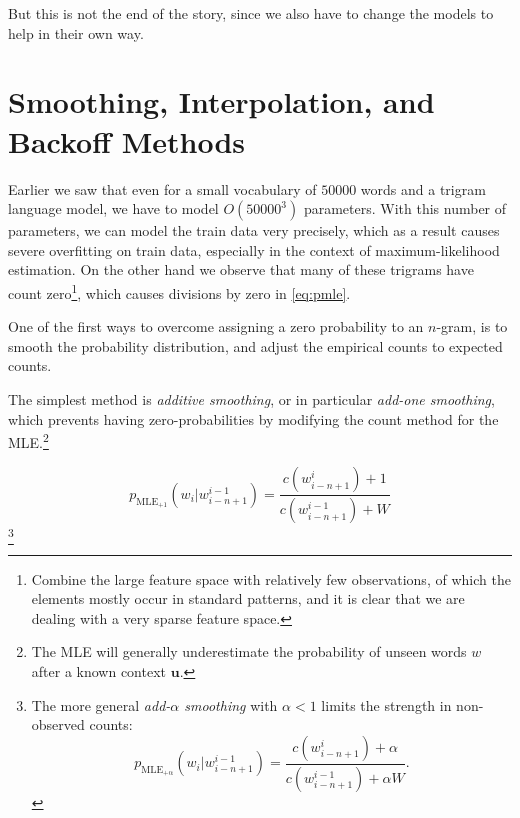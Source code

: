 But this is not the end of the story, since we also have to change the models to help in their own way.


\section{Smoothing, Interpolation, and Backoff Methods}
Earlier we saw that even for a small vocabulary of $50000$ words and a trigram language model, we have to model $O(50000^3)$ parameters. With this number of parameters, we can model the train data very precisely, which as a result causes severe overfitting on train data, especially in the context of maximum-likelihood estimation. On the other hand we observe that many of these trigrams have count zero\footnote{Combine the large feature space with relatively few observations, of which the elements mostly occur in standard patterns, and it is clear that we are dealing with a very sparse feature space.}, which causes divisions by zero in \cref{eq:pmle}.

One of the first ways to overcome assigning a zero probability to an $n$-gram, is to smooth the probability distribution, and adjust the empirical counts to expected counts.

The simplest method is \emph{additive smoothing}, or in particular \emph{add-one smoothing}, which prevents having zero-probabilities by modifying the count method for the MLE.\footnote{The MLE will generally underestimate the probability of unseen words $w$ after a known context $\mathbf{u}$.}



\begin{equation} p_{\operatorname{MLE_{+1}}}\left(w_i|w_{i-n+1}^{i-1}\right) = \frac{c\left(w_{i-n+1}^i\right)+1}{c\left(w_{i-n+1}^{i-1}\right)+W}\label{eq:paddone}
\end{equation}\footnote{The more general \emph{add-$\alpha$ smoothing} with $\alpha < 1$ limits the strength in non-observed counts: \[ p_{\operatorname{MLE_{+\alpha}}}\left(w_i|w_{i-n+1}^{i-1}\right) = \frac{c\left(w_{i-n+1}^i\right)+\alpha}{c\left(w_{i-n+1}^{i-1}\right)+\alpha W}.\]}


